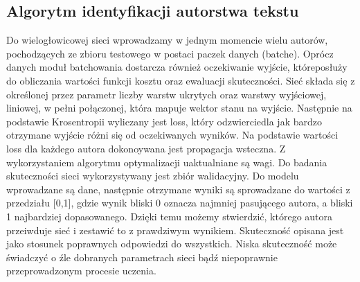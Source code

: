 \subsection{Algorytm identyfikacji autorstwa tekstu}

Do wielogłowicowej sieci wprowadzamy w jednym momencie wielu autorów, pochodzących ze zbioru 
testowego w postaci paczek danych (batche). Oprócz danych moduł batchowania dostarcza również 
oczekiwanie wyjście, któreposłuży do obliczania wartości funkcji kosztu oraz ewaluacji skuteczności. 
Sieć składa się z określonej przez parametr liczby warstw ukrytych oraz warstwy wyjściowej, 
liniowej, w pełni połączonej, która mapuje wektor stanu na wyjście. Następnie na podstawie 
Krosentropii wyliczany jest loss, który odzwierciedla jak bardzo otrzymane wyjście różni się od oczekiwanych 
wyników. Na podstawie wartości loss dla każdego autora dokonoywana jest propagacja wsteczna. 
Z wykorzystaniem algorytmu optymalizacji uaktualniane są wagi. 
\newline
\newline
Do badania skuteczności sieci wykorzystywany jest zbiór walidacyjny. Do modelu wprowadzane są dane, 
następnie otrzymane wyniki są sprowadzane do wartości z przedziału [0,1], 
gdzie wynik bliski 0 oznacza najmniej pasującego autora, a bliski 1 najbardziej dopasowanego.
Dzięki temu możemy stwierdzić, którego autora przeiwduje sieć i zestawić to z prawdziwym wynikiem.
Skuteczność opisana jest jako stosunek poprawnych odpowiedzi do wszystkich. Niska skuteczność może 
świadczyć o źle dobranych parametrach sieci bądź niepoprawnie przeprowadzonym procesie uczenia.